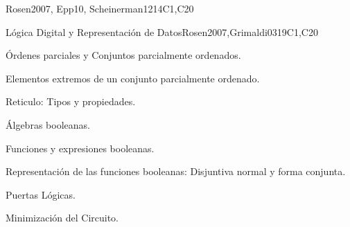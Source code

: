 \begin{syllabus}
\begin{unit}{\DSProofTechniques}{}{Rosen2007, Epp10, Scheinerman12}{14}{C1,C20}
\begin{topics}
        \item \DSProofTechniquesTopicNotions%
        \item \DSProofTechniquesTopicThe%
        \item \DSProofTechniquesTopicDirect%
        \item \DSProofTechniquesTopicDisproving%
        \item \DSProofTechniquesTopicProof%
        \item \DSProofTechniquesTopicInduction%
        \item \DSProofTechniquesTopicStructural%
        \item \DSProofTechniquesTopicWeak%
        \item \DSProofTechniquesTopicRecursive%
        \item \DSProofTechniquesTopicWell%
\end{topics}

\begin{learningoutcomes}
	\item \DSProofTechniquesLOIdentifyTheUsed [\Assessment]
	\item \DSProofTechniquesLOOutline [\Usage ]
	\item \DSProofTechniquesLOApplyEach [\Usage ]
	\item \DSProofTechniquesLODetermineWhich [\Assessment]
	\item \DSProofTechniquesLOExplainTheIdeas [\Familiarity ]
	\item \DSProofTechniquesLOExplainTheWeak [\Assessment]
	\item \DSProofTechniquesLOStateThe [\Familiarity]
\end{learningoutcomes}
\end{unit}

\begin{unit}{Lógica Digital y Representación de Datos}{}{Rosen2007,Grimaldi03}{19}{C1,C20}
   \begin{topics}
	\item Órdenes parciales y Conjuntos parcialmente ordenados.   
 	\item Elementos extremos de un conjunto parcialmente ordenado.
	\item Reticulo: Tipos y propiedades.
	\item Álgebras booleanas.
	\item Funciones y expresiones booleanas.
	\item Representación de las funciones booleanas: Disjuntiva normal y forma conjunta.
	\item Puertas Lógicas.
	\item Minimización del Circuito.
   \end{topics}


\end{unit}
\end{syllabus}
